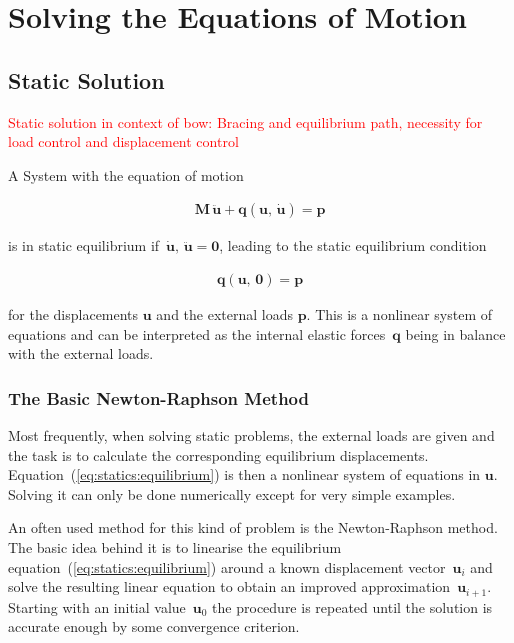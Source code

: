
\chapter{Solving the Equations of Motion}

\section{Static Solution}

\textcolor{red}{Static solution in context of bow: Bracing and equilibrium path, necessity for load control and displacement control}

A System with the equation of motion

\begin{align}
\boldsymbol{M}\,\ddot{\boldsymbol{u}} + \boldsymbol{q}(\boldsymbol{u},\,\dot{\boldsymbol{u}}) = \boldsymbol{p}
\end{align}

is in static equilibrium if~$\dot{\boldsymbol{u}},\,\ddot{\boldsymbol{u}} = \boldsymbol{0}$, leading to the static equilibrium condition

\begin{align}
\boldsymbol{q}(\boldsymbol{u},\,\boldsymbol{0}) = \boldsymbol{p}\label{eq:statics:equilibrium}
\end{align}

for the displacements $\boldsymbol{u}$ and the external loads $\boldsymbol{p}$.
This is a nonlinear system of equations and can be interpreted as the internal elastic forces~$\boldsymbol{q}$ being in balance with the external loads.

\subsection{The Basic Newton-Raphson Method}

Most frequently, when solving static problems, the external loads are given and the task is to calculate the corresponding equilibrium displacements.
Equation~(\ref{eq:statics:equilibrium}) is then a nonlinear system of equations in $\boldsymbol{u}$. Solving it can only be done numerically except for very simple examples.

An often used method for this kind of problem is the Newton-Raphson method. The basic idea behind it is to linearise the equilibrium equation~(\ref{eq:statics:equilibrium}) around a known displacement vector~$\boldsymbol{u}_i$ and solve the resulting linear equation to obtain an improved approximation~$\boldsymbol{u}_{i+1}$. Starting with an initial value~$\boldsymbol{u}_0$ the procedure is repeated until the solution is accurate enough by some convergence criterion.

